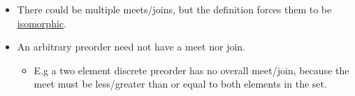 \begin{itemize}
    \item There could be multiple meets/joins, but the definition forces them to be \href{doc/1 math/Seven Sketches in Compositionality/Chapter 1: Generative Effects/4 Monotone maps/3 Preorder isomorphism}{isomorphic}.
    \item An arbitrary preorder need not have a meet nor join.
          \begin{itemize}
            \item E.g a two element discrete preorder has no overall meet/join, because the meet must be less/greater than or equal to both elements in the set.
          \end{itemize}
  \end{itemize}